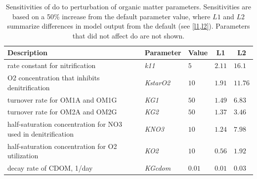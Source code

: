 \documentclass[letterpaper,12pt,oneside]{article}\usepackage[]{graphicx}\usepackage[]{color}
\begin{document}
\begin{table}[!tbp]
{\normalsize
\caption{Sensitivities of \ac{do} to perturbation of organic matter parameters.  Sensitivities are based on a 50\% increase from the default parameter value, where $L1$ and $L2$ summarize differences in model output from the default (see \cref{l1,l2}).  Parameters that did not affect \ac{do} are not shown.\label{tab:omsens}} 
\begin{center}
\begin{tabular}{lllll}
\hline\hline
\multicolumn{1}{l}{Description}&\multicolumn{1}{c}{Parameter}&\multicolumn{1}{c}{Value}&\multicolumn{1}{c}{L1}&\multicolumn{1}{c}{L2}\tabularnewline
\hline
rate constant for nitrification&\textit{k11}&$5$&$2.11$&$16.1$\tabularnewline
O2 concentration that inhibits denitrification&\textit{KstarO2}&$10$&$1.91$&$11.76$\tabularnewline
turnover rate for OM1A and OM1G&\textit{KG1}&$50$&$1.49$&$6.83$\tabularnewline
turnover rate for OM2A and OM2G&\textit{KG2}&$50$&$1.37$&$3.46$\tabularnewline
half-saturation concentration for NO3 used in denitrification&\textit{KNO3}&$10$&$1.24$&$7.98$\tabularnewline
half-saturation concentration for O2 utilization&\textit{KO2}&$10$&$0.56$&$1.92$\tabularnewline
decay rate of CDOM, 1/day&\textit{KGcdom}&$0.01$&$0.01$&$0.03$\tabularnewline
\hline
\end{tabular}\end{center}}

\end{table}
\end{document}
